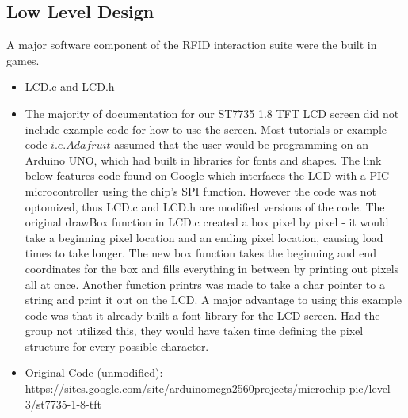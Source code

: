 \documentclass[12pt]{article} %
\begin{document}
\begin{itemize}


\subsection{Low Level Design}\label{swLowLevel} %
%



A major software component of the RFID interaction suite were the built in games.

\begin{itemize}
	\item LCD.c and LCD.h
		\item The majority of documentation for our ST7735 1.8 TFT LCD screen did not include example code for how to use the screen. Most tutorials or example code \(i.e. Adafruit\) assumed that the user would be programming on an Arduino UNO, which had built in libraries for fonts and shapes. The link below features code found on Google which interfaces the LCD with a PIC microcontroller using the chip's SPI function. However the code was not optomized, thus LCD.c and LCD.h are modified versions of the code. The original drawBox function in LCD.c created a box pixel by pixel - it would take a beginning pixel location and an ending pixel location, causing load times to take longer. The new box function takes the beginning and end coordinates for the box and fills everything in between by printing out pixels all at once. Another function printrs was made to take a char pointer to a string and print it out on the LCD. A major advantage to using this example code was that it already built a font library for the LCD screen. Had the group not utilized this, they would have taken time defining the pixel structure for every possible character. 
		\item Original Code (unmodified): https://sites.google.com/site/arduinomega2560projects/microchip-pic/level-3/st7735-1-8-tft
	\end {itemize}


\end{itemize}
\end{document}
